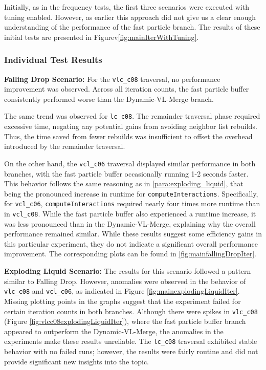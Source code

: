 Initially, as in the frequency tests, the first three scenarios were executed with tuning enabled. However, as earlier this approach did not give us a clear enough understanding of the performance of the fast particle branch. The results of these initial tests are presented in Figurev\ref{fig:mainIterWithTuning}.

\subsubsection{Individual Test Results}

\textbf{Falling Drop Scenario:}
For the \texttt{vlc\_c08} traversal, no performance improvement was observed. Across all iteration counts, the fast particle buffer consistently performed worse than the Dynamic-VL-Merge branch. 

The same trend was observed for \texttt{lc\_c08}. The remainder traversal phase required excessive time, negating any potential gains from avoiding neighbor list rebuilds. Thus, the time saved from fewer rebuilds was insufficient to offset the overhead introduced by the remainder traversal.


On the other hand, the \texttt{vcl\_c06} traversal displayed similar performance in both branches, with the fast particle buffer occasionally running 1-2 seconds faster. This behavior follows the same reasoning as in \ref{para:exploding_liquid}, that being the pronounced increase in runtime for \texttt{computeInteractions}. Specifically, for \texttt{vcl\_c06}, \texttt{computeInteractions} required nearly four times more runtime than in \texttt{vcl\_c08}. While the fast particle buffer also experienced a runtime increase, it was less pronounced than in the Dynamic-VL-Merge, explaining why the overall performance remained similar. While these results suggest some efficiency gains in this particular experiment, they do not indicate a significant overall performance improvement. The corresponding plots can be found in \ref{fig:mainfallingDropIter}.


\textbf{Exploding Liquid Scenario:}
The results for this scenario followed a pattern similar to Falling Drop. However, anomalies were observed in the behavior of \texttt{vlc\_c08} and \texttt{vcl\_c06}, as indicated in Figure \ref{fig:mainexplodingLiquidIter}. Missing plotting points in the graphs suggest that the experiment failed for certain iteration counts in both branches. Although there were spikes in \texttt{vlc\_c08} (Figure \ref{fig:vlcc08explodingLiquidIter}), where the fast particle buffer branch appeared to outperform the Dynamic-VL-Merge, the anomalies in the experiments make these results unreliable. The \texttt{lc\_c08} traversal exhibited stable behavior with no failed runs; however, the results were fairly routine and did not provide significant new insights into the topic.


